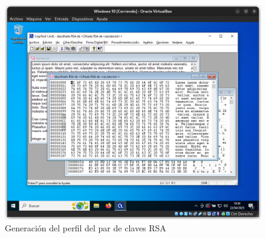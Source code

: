 \begin{figure}[H]
    \includegraphics[width=\textwidth]{DesencriptadoRSA-2}
    \caption{Generación del perfil del par de claves RSA}
\end{figure}
